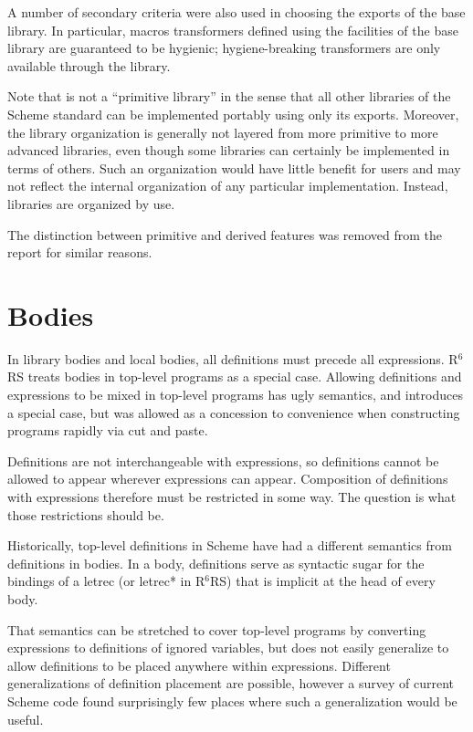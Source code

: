 \documentclass[twoside,twocolumn]{algol60}
\newcommand{\rn}[1]{R$^{#1}$RS}
\begin{document}
A number of secondary criteria were also used in choosing the exports
of the base library.  In particular, macros transformers defined using
the facilities of the base library are guaranteed to be hygienic;
hygiene-breaking transformers are only available through the
 library.

Note that  is not a ``primitive library'' in the
sense that all other libraries of the Scheme standard can be
implemented portably using only its exports.  Moreover, the library
organization is generally not layered from more primitive to more advanced
libraries, even though some libraries can certainly be implemented in
terms of others.
Such an organization would have little benefit for users and may not
reflect the internal organization of any particular implementation.
Instead, libraries are organized by use.

The distinction between primitive and derived features was removed from
the report for similar reasons.

\section{Bodies}

In library bodies and local bodies, all definitions must precede all
expressions. \rn{6} treats bodies in top-level programs as a special
case.  Allowing definitions and expressions to be mixed in top-level
programs has ugly semantics, and introduces a special case, but was
allowed as a concession to convenience when constructing programs
rapidly via cut and paste.

Definitions are not interchangeable with expressions, so definitions
cannot be allowed to appear wherever expressions can appear.
Composition of definitions with expressions therefore must be
restricted in some way.  The question is what those restrictions
should be.

Historically, top-level definitions in Scheme have had a different
semantics from definitions in bodies.  In a body, definitions serve as
syntactic sugar for the bindings of a {\cf letrec} (or {\cf letrec*}
in \rn{6}) that is implicit at the head of every body.

That semantics can be stretched to cover top-level programs by
converting expressions to definitions of ignored variables, but does
not easily generalize to allow definitions to be placed anywhere
within expressions.  Different generalizations of definition placement
are possible, however a survey of current Scheme code found
surprisingly few places where such a generalization would be useful.
\end{document}
